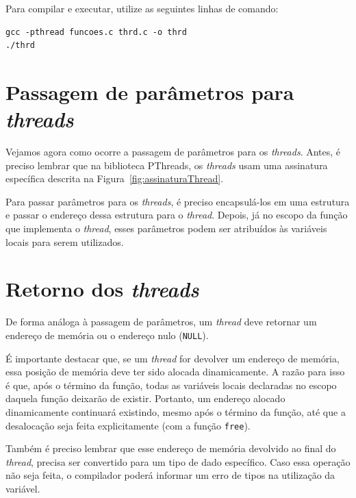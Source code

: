 Para compilar e executar, utilize as seguintes linhas de comando:

\begin{lstlisting}[style=MyBashStyle]
gcc -pthread funcoes.c thrd.c -o thrd
./thrd
\end{lstlisting}


\section{Passagem de parâmetros para \textit{threads}}
Vejamos agora como ocorre a passagem de parâmetros para os \textit{threads}. Antes, é preciso lembrar que na biblioteca PThreads, os \textit{threads} usam uma assinatura específica descrita na Figura~\ref{fig:assinaturaThread}. 

Para passar parâmetros para os \textit{threads}, é preciso encapsulá-los em uma estrutura e passar o endereço dessa estrutura para o \textit{thread}. Depois, já no escopo da função que implementa o \textit{thread}, esses parâmetros podem ser atribuídos às variáveis locais para serem utilizados.

\section{Retorno dos \textit{threads}}
De forma análoga à passagem de parâmetros, um \textit{thread} deve retornar um endereço de memória ou o endereço nulo (\texttt{NULL}).  

É importante destacar que, se um \textit{thread} for devolver um endereço de memória, essa posição de memória deve ter sido alocada dinamicamente. A razão para isso é que, após o término da função, todas as variáveis locais declaradas no escopo daquela função deixarão de existir. Portanto, um endereço alocado dinamicamente continuará existindo, mesmo após o término da função, até que a desalocação seja feita explicitamente (com a função \texttt{free}).

Também é preciso lembrar que esse endereço de memória devolvido ao final do \textit{thread}, precisa ser convertido para um tipo de dado específico. Caso essa operação não seja feita, o compilador poderá informar um erro de tipos na utilização da variável.

